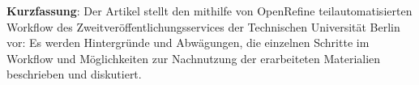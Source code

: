 \textbf{Kurzfassung}: Der Artikel stellt den mithilfe von OpenRefine
teilautomatisierten Workflow des Zweitveröffentlichungsservices der
Technischen Universität Berlin vor: Es werden Hintergründe und
Abwägungen, die einzelnen Schritte im Workflow und Möglichkeiten zur
Nachnutzung der erarbeiteten Materialien beschrieben und diskutiert.
